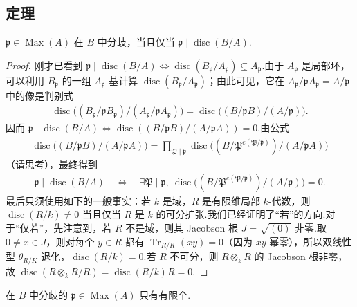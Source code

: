 \subsection{定理}\label{sec:nt-3-4-3}
\begin{theorem*}
$\mathfrak p\in\operatorname{Max}(A)$ 在 $B$ 中分歧，当且仅当 $\mathfrak p\mid\operatorname{disc}(B/A)$.
\end{theorem*}
\begin{proof}
刚才已看到 $\mathfrak p\mid\operatorname{disc}(B/A)\Leftrightarrow\operatorname{disc}(B_{\mathfrak p}/A_{\mathfrak p})\subsetneq A_{\mathfrak p}$.由于 $A_{\mathfrak p}$ 是局部环，可以利用 $B_{\mathfrak p}$ 的一组 $A_{\mathfrak p}$-基计算 $\operatorname{disc}(B_{\mathfrak p}/A_{\mathfrak p})$；由此可见，它在 $A_{\mathfrak p}/\mathfrak pA_{\mathfrak p}=A/\mathfrak p$ 中的像是判别式
\begin{align*}
\operatorname{disc}\bigl((B_{\mathfrak p}/\mathfrak pB_{\mathfrak p})/(A_{\mathfrak p}/\mathfrak pA_{\mathfrak p})\bigr)
=\operatorname{disc}\bigl((B/\mathfrak pB)/(A/\mathfrak p)\bigr).
\end{align*}
因而 $\mathfrak p\mid\operatorname{disc}(B/A)\Leftrightarrow\operatorname{disc}((B/\mathfrak pB)/(A/\mathfrak pA))=0$.由公式
\begin{align*}
\operatorname{disc}\bigl((B/\mathfrak pB)/(A/\mathfrak pA)\bigr)
=\prod_{\mathfrak P\mid\mathfrak p}\operatorname{disc}\bigl((B/\mathfrak P^{e(\mathfrak P/\mathfrak p)})/(A/\mathfrak pA)\bigr)
\end{align*}
（请思考），最终得到
\begin{align*}
\mathfrak p\mid\operatorname{disc}(B/A)\quad\Longleftrightarrow\quad
\exists\mathfrak P\mid\mathfrak p,\ \operatorname{disc}\bigl((B/\mathfrak P^{e(\mathfrak P/\mathfrak p)})/(A/\mathfrak p)\bigr)=0.
\end{align*}
最后只须使用如下的一般事实：若 $k$ 是域，$R$ 是有限维局部 $k$-代数，则 $\operatorname{disc}(R/k)\ne0$ 当且仅当 $R$ 是 $k$ 的可分扩张.我们已经证明了``若''的方向.对于``仅若''，先注意到，若 $R$ 不是域，则其 Jacobson 根 $J=\sqrt{(0)}$ 非零.取 $0\ne x\in J$，则对每个 $y\in R$ 都有 $\operatorname{Tr}_{R/K}(xy)=0$（因为 $xy$ 幂零），所以双线性型 $\theta_{R/K}$ 退化，$\operatorname{disc}(R/k)=0$.若 $R$ 不可分，则 $R\otimes_kR$ 的 Jacobson 根非零，故 $\operatorname{disc}(R\otimes_kR/R)=\operatorname{disc}(R/k)R=0$.
\end{proof}
\begin{corollary*}
在 $B$ 中分歧的 $\mathfrak p\in\operatorname{Max}(A)$ 只有有限个.
\end{corollary*}
